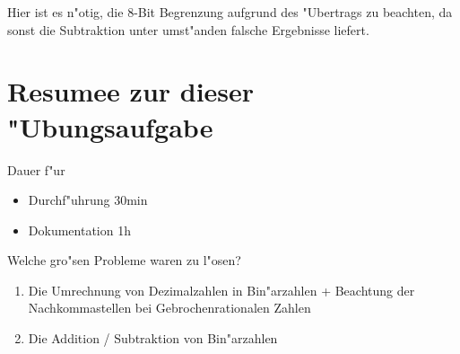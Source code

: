 \documentclass[a4paper,11pt,titlepage]{article}
\begin{document}
    Hier ist es n"otig, die 8-Bit Begrenzung aufgrund des "Ubertrags zu beachten, da sonst die Subtraktion unter umst"anden falsche Ergebnisse liefert.



    \section{Resumee zur dieser "Ubungsaufgabe}
    Dauer f"ur
    \begin{itemize}
        \item Durchf"uhrung 30min
        \item Dokumentation 1h
    \end{itemize}
    Welche gro"sen Probleme waren zu l"osen?
    \begin{enumerate}
        \item Die Umrechnung von Dezimalzahlen in Bin"arzahlen + Beachtung der Nachkommastellen bei Gebrochenrationalen Zahlen
        \item Die Addition / Subtraktion von Bin"arzahlen
    \end{enumerate}
\end{document}
